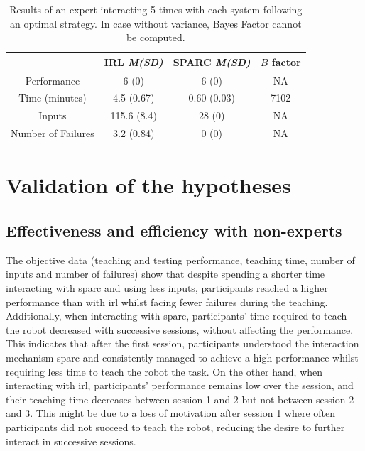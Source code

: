 \begin{table}[ht]
	\centering
	\caption{Results of an expert interacting 5 times with each system following an optimal strategy. In case without variance, Bayes Factor cannot be computed.}
	\label{tab:control_expert}
	\begin{tabular}{cccc}
	&IRL \textit{M(SD)} & SPARC \textit{M(SD)} & $B$ factor\\
		\midrule
		Performance & 6 (0) & 6 (0) & NA \\
		Time (minutes) & 4.5 (0.67) & 0.60 (0.03) & 7102 \\
		Inputs & 115.6 (8.4) & 28 (0) & NA \\
		Number of Failures & 3.2 (0.84) & 0 (0) & NA \\
	\end{tabular}
\end{table}


\section{Validation of the hypotheses}

\subsection{Effectiveness and efficiency with non-experts}
The objective data (teaching and testing performance, teaching time, number of inputs and number of failures) show that despite spending a shorter time interacting with \gls{sparc} and using less inputs, participants reached a higher performance than with \gls{irl} whilst facing fewer failures during the teaching. Additionally, when interacting with \gls{sparc}, participants' time required to teach the robot decreased with successive sessions, without affecting the performance. This indicates that after the first session, participants understood the interaction mechanism \gls{sparc} and consistently managed to achieve a high performance whilst requiring less time to teach the robot the task. On the other hand, when interacting with \gls{irl}, participants' performance remains low over the session, and their teaching time decreases between session 1 and 2 but not between session 2 and 3. This might be due to a loss of motivation after session 1 where often participants did not succeed to teach the robot, reducing the desire to further interact in successive sessions. 

